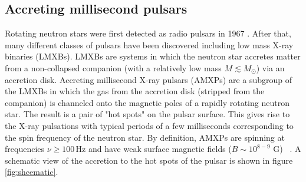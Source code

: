 \documentclass{wihuri}
\begin{document}



\subsection{Accreting millisecond pulsars}






Rotating neutron stars were first detected as radio pulsars in 1967 \cite{gold68}. %
After that, many different classes of pulsars have been discovered including low mass X-ray binaries (LMXBs). LMXBs are systems in which the neutron star accretes matter from a non-collapsed companion (with a relatively low mass $M \lesssim  M_{\odot}$) via an accretion disk. Accreting millisecond X-ray pulsars (AMXPs) are a subgroup of the LMXBs in which the gas from the accretion disk (stripped from the companion) is channeled onto the magnetic poles of a rapidly rotating neutron star. The result is a pair of "hot spots" on the pulsar surface.  This gives rise to the X-ray pulsations with typical periods of a few milliseconds corresponding to the spin frequency of the neutron star. By definition, AMXPs are spinning at frequencies $\nu \ge 100 \, \mathrm{Hz}$ and have weak surface magnetic fields ($B \sim 10^{8-9}$ G) ~\cite{patruno}. A schematic view of the accretion to the hot spots of the pulsar is shown in figure \ref{fig:shcematic}.
\end{document}
